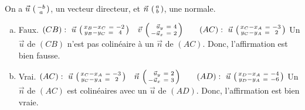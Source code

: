 \documentclass[12pt, a4paper]{article}
\begin{document}
	\begin{Exercise}[number={53}]
		On a $\vec{u}\ \begin{psmallmatrix}-b \\ a\end{psmallmatrix}$, un vecteur directeur, et $\vec{n}\ \begin{psmallmatrix}a \\ b\end{psmallmatrix}$, une normale.
	   \begin{enumerate}[a)]
			\item	Faux. $(CB):\ \vec{u}\ \begin{psmallmatrix}x_B-x_C\ =& -2 \\ y_B-y_C\ =& 4\end{psmallmatrix} \quad \vec{v}\ \begin{psmallmatrix}\hphantom{-}\vec{u}_y\ =& 4 \\ -\vec{u}_x\ =& 2\end{psmallmatrix} \qquad (AC):\ \vec{u}\ \begin{psmallmatrix}x_C-x_A\ =& -3 \\ y_C-y_A\ =& 2\end{psmallmatrix}$ \smallbreak Un $\vec{u}$ de $(CB)$ n'est pas colinéaire à un $\vec{n}$ de $(AC)$. Donc, l'affirmation est bien fausse.
			\item	Vrai. $(AC):\ \vec{u}\ \begin{psmallmatrix}x_C-x_A\ =& -3 \\ y_C-y_A\ =& 2\end{psmallmatrix} \quad \vec{n}\ \begin{psmallmatrix}\hphantom{-}\vec{u}_y\ =& 2 \\ -\vec{u}_x\ =& 3\end{psmallmatrix} \qquad (AD):\ \vec{u}\ \begin{psmallmatrix}x_D-x_A\ =& -4 \\ y_D-y_A\ =& -6\end{psmallmatrix}$ \smallbreak Un $\vec{n}$ de $(AC)$ est colinéaires avec un $\vec{u}$ de $(AD)$. Donc, l'affirmation est bien vraie.
	   \end{enumerate}
	\end{Exercise}
\end{document}
